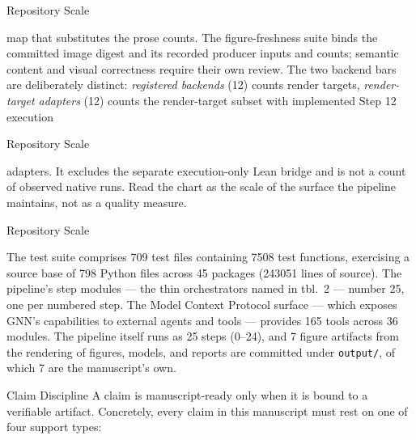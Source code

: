 \documentclass[
  ignorenonframetext,
]{beamer}
\newenvironment{archivecaptionframe}{\par\begingroup}{\par\endgroup}
\begin{document}
\begin{frame}{Repository Scale}

\begin{archivecaptionframe}

map that substitutes the prose counts. The figure-freshness suite binds
the committed image digest and its recorded producer inputs and counts;
semantic content and visual correctness require their own review. The
two backend bars are deliberately distinct: \emph{registered backends}
(12) counts render targets, \emph{render-target adapters} (12) counts
the render-target subset with implemented Step 12 execution

\end{archivecaptionframe}

\end{frame}

\begin{frame}{Repository Scale}

\begin{archivecaptionframe}

adapters. It excludes the separate execution-only Lean bridge and is not
a count of observed native runs. Read the chart as the scale of the
surface the pipeline maintains, not as a quality measure.

\end{archivecaptionframe}

\end{frame}

\begin{frame}{Repository Scale}

The test suite comprises 709 test files containing 7508 test functions,
exercising a source base of 798 Python files across 45 packages (243051
lines of source). The pipeline's step modules --- the thin orchestrators
named in tbl.~2 --- number 25, one per numbered
step. The Model Context Protocol surface --- which exposes GNN's
capabilities to external agents and tools --- provides 165 tools across
36 modules. The pipeline itself runs as 25 steps (0--24), and 7 figure
artifacts from the rendering of figures, models, and reports are
committed under \texttt{output/}, of which 7 are the manuscript's own.
\end{frame}

\begin{frame}{Claim Discipline}
\protect{}\label{claim-discipline}
A claim is manuscript-ready only when it is bound to a verifiable
artifact. Concretely, every claim in this manuscript must rest on one of
four support types:

\end{frame}
\end{document}
